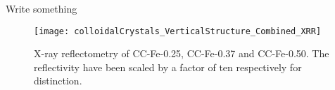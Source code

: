 \documentclass[\main/dresen_thesis.tex]{subfiles}
\begin{document}
  \label{sec:colloidalCrystals:layers:xrr}
  Write something
  \begin{figure}[tb]
    \centering
    \texttt{[image: colloidalCrystals\_VerticalStructure\_Combined\_XRR]}
    \caption{\label{fig:colloidalCrystals:xrr}X-ray reflectometry of CC-Fe-0.25, CC-Fe-0.37 and CC-Fe-0.50. The reflectivity have been scaled by a factor of ten respectively for distinction.}
  \end{figure}

\end{document}
